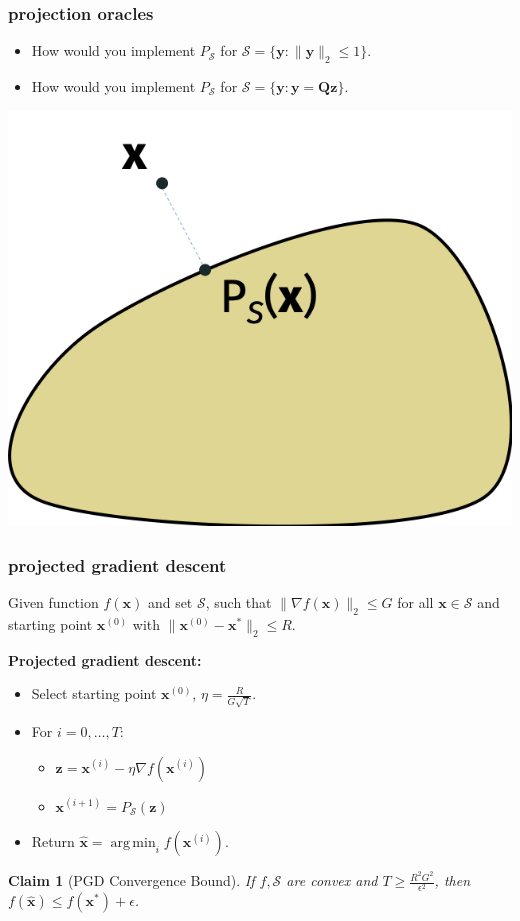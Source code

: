 \documentclass[compress]{beamer}
\newcommand{\bv}[1]{\mathbf{#1}}
\DeclareMathOperator*{\argmin}{arg\,min}
\newtheorem{claim}[theorem]{Claim}
\begin{document}
\begin{frame}
	\frametitle{projection oracles}
	\begin{itemize}
		\item How would you implement $P_\mathcal{S}$ for $\mathcal{S} = \{\bv{y}:\|\bv{y}\|_2\leq 1\}.$
		\item How would you implement $P_\mathcal{S}$ for $\mathcal{S} = \{\bv{y}:\bv{y} = \bv{Q}\bv{z}\}.$
	\end{itemize}
\begin{center}
	\includegraphics[width=.5\textwidth]{projection_image.png}
\end{center}
\end{frame}

\begin{frame}[t]
	\frametitle{projected gradient descent}
	Given function $f(\bv{x})$ and set $\mathcal{S}$, such that $\|\nabla f(\bv{x})\|_2 \leq G$ for all $\bv{x}\in \mathcal{S}$ and starting point $\bv{x}^{(0)}$ with $\|\bv{x}^{(0)} - \bv{x}^*\|_2 \leq R$.  
	
	\textbf{Projected gradient descent:}
	\begin{itemize}
		\item Select starting point $\bv{x}^{(0)}$, $\eta = \frac{R}{G\sqrt{T}}$. 
		\item For $i = 0,\ldots, T$:
		\begin{itemize}
			\item $\bv{z} = \bv{x}^{(i)} - \eta \nabla f(\bv{x}^{(i)})$
			\item $\bv{x}^{(i+1)} = P_\mathcal{S}(\bv{z})$
		\end{itemize}
		\item Return $\hat{\bv{x}} = \argmin_{i} f(\bv{x}^{(i)})$.
	\end{itemize}
\begin{claim}[PGD Convergence Bound]
	If $f, \mathcal{S}$ are convex and $T \geq \frac{R^2G^2}{\epsilon^2}$, then $f(\hat{\bv{x}}) \leq f(\bv{x}^*) + \epsilon$.
\end{claim}
\end{frame}
\end{document}
